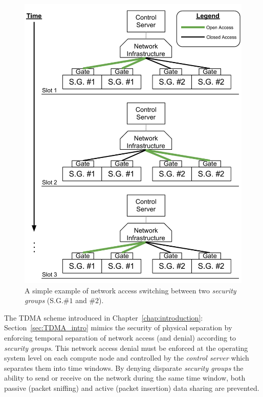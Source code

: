 \documentclass[oneside,12pt]{memoir}
\begin{document}
\begin{figure}
\centering
\includegraphics[scale=0.55]{network_access_switching.pdf}
\caption{A simple example of network access switching between two \textit{security groups} (S.G.$\#1$ and $\#2$).}
\label{fig:network_access_switching}
\end{figure}

The TDMA scheme introduced in Chapter~\ref{chap:introduction}: Section~\ref{sec:TDMA_intro} mimics the security of physical separation by enforcing temporal separation of network access (and denial) according to \textit{security groups}. This network access denial must be enforced at the operating system level on each compute node and controlled by the \textit{control server} which separates them into time windows. By denying disparate \textit{security groups} the ability to send or receive on the network during the same time window, both passive (packet sniffing) and active (packet insertion) data sharing are prevented.
\end{document}

